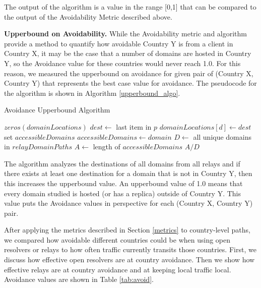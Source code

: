 The output of the algorithm is a value in the range [0,1] that can be compared to the output of the Avoidability Metric described above.  

{\bf Upperbound on Avoidability.}  While the Avoidability metric and algorithm provide a method to quantify how avoidable Country Y is from a client in Country X, it may be the case that a number of domains are hosted in Country Y, so the Avoidance value for these countries would never reach 1.0.  For this reason, we measured the upperbound on avoidance for given pair of (Country X, Country Y) that represents the best case value for avoidance.  The pseudocode for the algorithm is shown in Algorithm \ref{upperbound_algo}.

\begin{algorithm}
\caption{Avoidance Upperbound Algorithm}
\label{upperbound_algo}
\begin{algorithmic}[1]
    \State $zeros(domainLocations)$
		\State $dest \gets $ last item in $p$
		\State $domainLocations[d] \gets dest$
    \EndFor
    \State set $accessibleDomains$
    \State $accessibleDomains \gets domain$
    \EndIf
    \EndFor
    \State $D \gets$ all unique domains in  $relayDomainPaths$
    \State $A \gets$ length of $accessibleDomains$
    \State \Return $A / D$
\EndFunction
\end{algorithmic}
\end{algorithm}

The algorithm analyzes the destinations of all domains from all relays and if there exists at least one destination for a domain that is not in Country Y, then this increases the upperbound value.  An upperbound value of 1.0 means that every domain studied is hosted (or has a replica) outside of Country Y.  This value puts the Avoidance values in perspective for each (Country X, Country Y) pair. 

After applying the metrics described in Section \ref{metrics} to country-level paths, we compared how avoidable different countries could be when using open resolvers or relays to how often traffic currently transits those countries.  First, we discuss how effective open resolvers are at country avoidance.  Then we show how effective relays are at country avoidance and at keeping local traffic local.  Avoidance values are shown in Table \ref{tab:avoid}.

